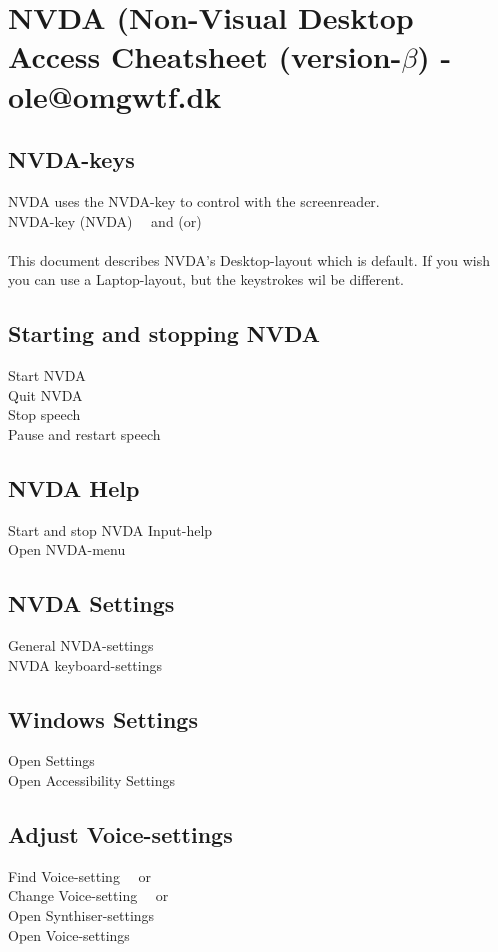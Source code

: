 \documentclass[a4paper, landscape, 11pt]{scrartcl}
\newcommand{\command}[2]{#1~\dotfill{}~#2\\} %
\begin{document}
\section*{NVDA (Non-Visual Desktop Access Cheatsheet (version-$\beta$) - ole@omgwtf.dk}

\hrulefill{}

\begin{multicols}{2}

\subsection*{NVDA-keys}
NVDA uses the NVDA-key to control with the screenreader. \\ 
\command{NVDA-key (NVDA)}{ and (or) } \\
This document describes NVDA's Desktop-layout which is default. If you wish you can use a Laptop-layout, but the keystrokes wil be different.

\subsection*{Starting and stopping NVDA}
\command{Start NVDA}{}
\command{Quit NVDA}{}
\command{Stop speech}{\keys{\ctrl}}
\command{Pause and restart speech}{\keys{\shift}}

\subsection*{NVDA Help}
\command{Start and stop NVDA Input-help}{}
\command{Open NVDA-menu}{}

\subsection*{NVDA Settings}
\command{General NVDA-settings}{}
\command{NVDA keyboard-settings}{}

\subsection*{Windows Settings}
\command{Open Settings}{}
\command{Open Accessibility Settings}{}

\subsection*{Adjust Voice-settings}
\command{Find Voice-setting}{ or \keys{\arrowkeyright}}
\command{Change Voice-setting}{ or \keys{\arrowkeydown}}
\command{Open Synthiser-settings}{}
\command{Open Voice-settings}{}


\end{multicols}
\end{document}
